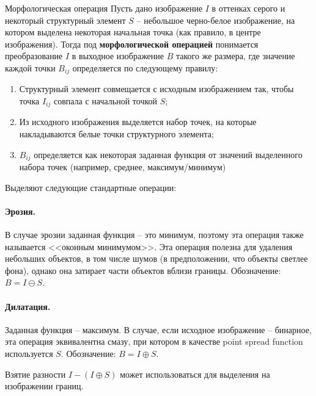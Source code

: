 
\begin{definition}{Морфологическая операция}
    Пусть дано изображение $I$ в оттенках серого и некоторый структурный элемент $S$ -- небольшое черно-белое изображение, на котором выделена некоторая начальная точка (как правило, в центре изображения). Тогда под \textbf{морфологической операцией} понимается преобразование $I$ в выходное изображение $B$ такого же размера, где значение каждой точки $B_{ij}$ определяется по следующему правилу:
    \begin{enumerate}
    \item
        Структурный элемент совмещается с исходным изображением так, чтобы точка $I_{ij}$ совпала с начальной точкой $S$;
    \item
        Из исходного изображения выделяется набор точек, на которые накладываются белые точки структурного элемента;
    \item
        $B_{ij}$ определяется как некоторая заданная функция от значений выделенного набора точек (например, среднее, максимум/минимум)
    \end{enumerate}
\end{definition}

Выделяют следующие стандартные операции:

\paragraph{Эрозия.}

В случае эрозии заданная функция -- это минимум, поэтому эта операция также называется <<оконным минимумом>>. Эта операция полезна для удаления небольших объектов, в том числе шумов (в предположении, что объекты светлее фона), однако она затирает части объектов вблизи границы. Обозначение: $B = I \ominus S$.

\paragraph{Дилатация.}

Заданная функция -- максимум. В случае, если исходное изображение -- бинарное, эта операция эквивалентна смазу, при котором в качестве point spread function используется $S$. Обозначение: $B = I \oplus S$.

Взятие разности $I - \left( I \oplus S \right)$ может использоваться для выделения на изображении границ.

